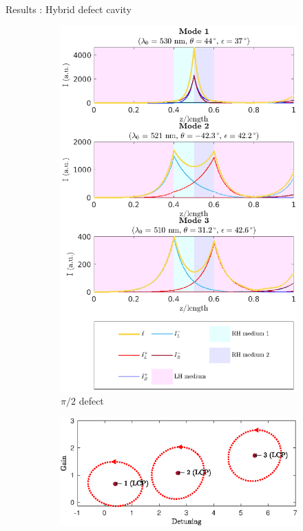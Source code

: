 \documentclass[aspectratio=169]{beamer}
\begin{document}
\begin{frame}{Results : Hybrid defect cavity}
\begin{figure}
\begin{subfigure}{0.24\linewidth}
			\includegraphics[width=\linewidth]{plots/hybrid_defect/pi_2/intensity_distribution}
			\caption{$\pi/2$ defect}
		\end{subfigure}
		\begin{subfigure}{0.24\linewidth}
			\includegraphics[width=\linewidth]{plots/hybrid_defect/pi_3/modes_found}

\end{subfigure}
\end{figure}
\end{frame}
\end{document}
